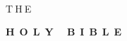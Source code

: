\thispagestyle{empty}
\begin{titlepage}
    \begin{center}
        {~}
        
        \vspace{10pt}
        
        {\large T$\:$H$\:$E}
        
        \vspace{10pt}
        
        {\Huge \textbf{\textsc{H$\;\:$O$\;\:$L$\;\:$Y$\;\:$ $\;\:$B$\;\:$I$\;\:$B$\;\:$L$\;\:$E}}}
        
        \vfill
    \end{center}
\end{titlepage}
